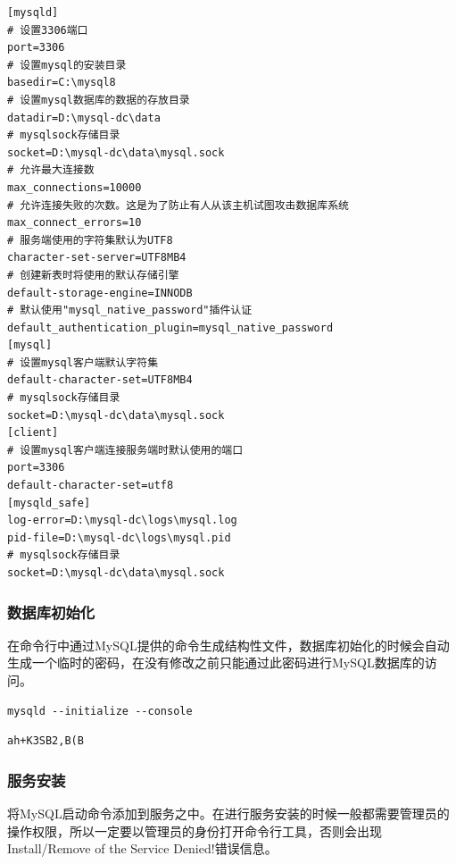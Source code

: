 \documentclass[12pt, openany, oneside]{book}
\begin{document}

\begin{lstlisting}
[mysqld]
# 设置3306端口
port=3306
# 设置mysql的安装目录
basedir=C:\mysql8
# 设置mysql数据库的数据的存放目录
datadir=D:\mysql-dc\data
# mysqlsock存储目录
socket=D:\mysql-dc\data\mysql.sock
# 允许最大连接数
max_connections=10000
# 允许连接失败的次数。这是为了防止有人从该主机试图攻击数据库系统
max_connect_errors=10
# 服务端使用的字符集默认为UTF8
character-set-server=UTF8MB4
# 创建新表时将使用的默认存储引擎
default-storage-engine=INNODB
# 默认使用"mysql_native_password"插件认证
default_authentication_plugin=mysql_native_password
[mysql]
# 设置mysql客户端默认字符集
default-character-set=UTF8MB4
# mysqlsock存储目录
socket=D:\mysql-dc\data\mysql.sock
[client]
# 设置mysql客户端连接服务端时默认使用的端口
port=3306
default-character-set=utf8
[mysqld_safe]
log-error=D:\mysql-dc\logs\mysql.log
pid-file=D:\mysql-dc\logs\mysql.pid
# mysqlsock存储目录
socket=D:\mysql-dc\data\mysql.sock
\end{lstlisting}

\subsubsection{数据库初始化}

在命令行中通过MySQL提供的命令生成结构性文件，数据库初始化的时候会自动生成一个临时的密码，在没有修改之前只能通过此密码进行MySQL数据库的访问。 \\


\begin{lstlisting}
mysqld --initialize --console
\end{lstlisting}

\begin{tcolorbox}
    \begin{verbatim}
ah+K3SB2,B(B
	\end{verbatim}
\end{tcolorbox}

\subsubsection{服务安装}

将MySQL启动命令添加到服务之中。在进行服务安装的时候一般都需要管理员的操作权限，所以一定要以管理员的身份打开命令行工具，否则会出现Install/Remove of the Service Denied!错误信息。 \\
\end{document}
